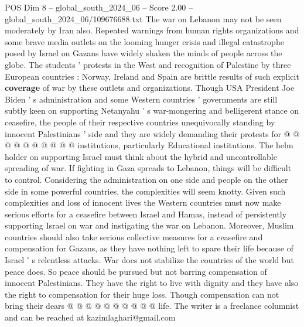 \begin{textsample}{POS Dim 8 – global\_south\_2024\_06 – Score 2.00 – global\_south\_2024\_06/109676688.txt}
The war on Lebanon may not be seen moderately by Iran also.
Repeated warnings from human rights organizations and some brave media outlets on the looming hunger crisis and illegal catastrophe posed by Israel on Gazans have widely shaken the minds of people across the globe.
The students ' protests in the West and recognition of Palestine by three European countries : Norway, Ireland and Spain are brittle results of such explicit \textbf{coverage} of war by these outlets and organizations.
Though USA President Joe Biden ' s administration and some Western countries ' governments are still subtly keen on supporting Netanyahu ' s war-mongering and belligerent stance on ceasefire, the people of their respective countries unequivocally standing by innocent Palestinians ' side and they are widely demanding their protests for @ @ @ @ @ @ @ @ @ @ institutions, particularly Educational institutions.
The helm holder on supporting Israel must think about the hybrid and uncontrollable spreading of war.
If fighting in Gaza spreads to Lebanon, things will be difficult to control.
Considering the administration on one side and people on the other side in some powerful countries, the complexities will seem knotty.
Given such complexities and loss of innocent lives the Western countries must now make serious efforts for a ceasefire between Israel and Hamas, instead of persistently supporting Israel on war and instigating the war on Lebanon.
Moreover, Muslim countries should also take serious collective measures for a ceasefire and compensation for Gazans, as they have nothing left to spare their life because of Israel ' s relentless attacks.
War does not stabilize the countries of the world but peace does.
So peace should be pursued but not barring compensation of innocent Palestinians.
They have the right to live with dignity and they have also the right to compensation for their huge loss.
Though compensation can not bring their dears @ @ @ @ @ @ @ @ @ @ life.
The writer is a freelance columnist and can be reached at kazimlaghari@gmail.com

\end{textsample}
